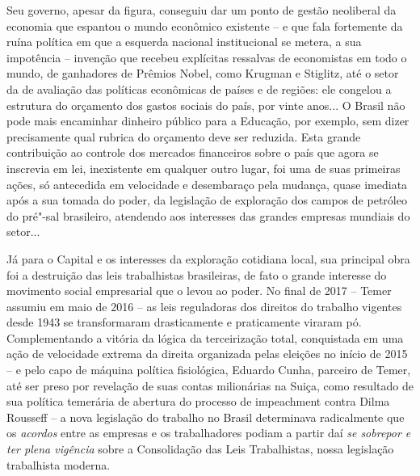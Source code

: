 Seu governo, apesar da figura, conseguiu dar um ponto de gestão
neoliberal da economia que espantou o mundo econômico existente -- e que
fala fortemente da ruína política em que a esquerda nacional
institucional se metera, a sua impotência -- invenção que recebeu
explícitas ressalvas de economistas em todo o mundo, de ganhadores de
Prêmios Nobel, como Krugman e Stiglitz, até o setor da  de avaliação das
políticas econômicas de países e de regiões: ele congelou a estrutura do
orçamento dos gastos sociais do país, por vinte anos... O Brasil não pode
mais encaminhar dinheiro público para a Educação, por exemplo, sem dizer
precisamente qual rubrica do orçamento deve ser reduzida. Esta grande
contribuição ao controle dos mercados financeiros sobre o país que agora se inscrevia em
lei, inexistente em qualquer outro lugar, foi uma de
suas primeiras ações, só antecedida em velocidade e
desembaraço pela mudança, quase imediata após a sua tomada do poder, da
legislação de exploração dos campos de petróleo do pré"-sal brasileiro,
atendendo aos interesses das grandes empresas mundiais do setor...

Já para o Capital e os interesses da exploração cotidiana local, sua
principal obra foi a destruição das leis trabalhistas brasileiras, de
fato o grande interesse do movimento social empresarial que o
levou ao poder. No final de 2017 -- Temer assumiu em maio de 2016 -- as
leis reguladoras dos direitos do trabalho vigentes desde 1943 se
transformaram drasticamente e praticamente viraram pó. Complementando a vitória da lógica da
terceirização total, conquistada em uma ação de velocidade extrema da
direita organizada pelas eleições no início de 2015 -- e pelo
capo de máquina política fisiológica, Eduardo Cunha, parceiro de
Temer, até ser preso por revelação de suas contas milionárias na Suiça,
como resultado de sua política temerária de abertura do processo de
impeachment contra Dilma Rousseff -- a nova legislação do trabalho no
Brasil determinava radicalmente que os \emph{acordos} entre as empresas e os
trabalhadores podiam a partir daí \emph{se sobrepor e ter plena
vigência} sobre a Consolidação das Leis Trabalhistas, nossa legislação trabalhista
moderna.

